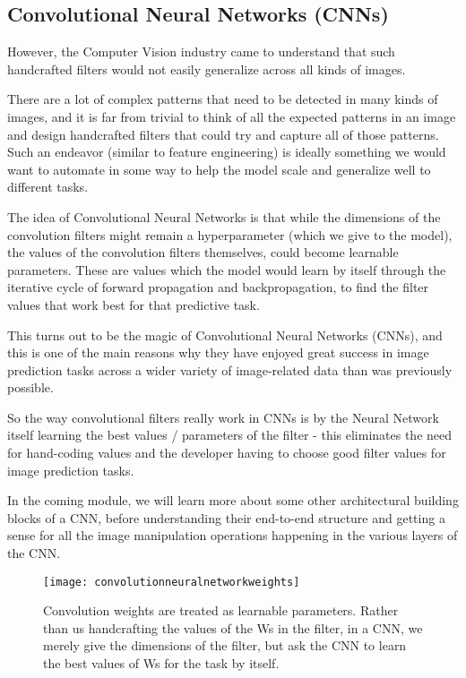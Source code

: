 	\subsection{Convolutional Neural Networks (CNNs)}
	\begin{bulletedlist}
		\item However, the Computer Vision industry came to understand that such handcrafted filters would not easily generalize across all kinds of images.
		\item There are a lot of complex patterns that need to be detected in many kinds of images, and it is far from trivial to think of all the expected patterns in an image and design handcrafted filters that could try and capture all of those patterns. Such an endeavor (similar to feature engineering) is ideally something we would want to automate in some way to help the model scale and generalize well to different tasks.
		\item The idea of Convolutional Neural Networks is that while the dimensions of the convolution filters might remain a hyperparameter (which we give to the model), the values of the convolution filters themselves, could become learnable parameters. These are values which the model would learn by itself through the iterative cycle of forward propagation and backpropagation, to find the filter values that work best for that predictive task.
		\item This turns out to be the magic of Convolutional Neural Networks (CNNs), and this is one of the main reasons why they have enjoyed great success in image prediction tasks across a wider variety of image-related data than was previously possible.
		\item So the way convolutional filters really work in CNNs is by the Neural Network itself learning the best values / parameters of the filter - this eliminates the need for hand-coding values and the developer having to choose good filter values for image prediction tasks.
		\item In the coming module, we will learn more about some other architectural building blocks of a CNN, before understanding their end-to-end structure and getting a sense for all the image manipulation operations happening in the various layers of the CNN.
	\end{bulletedlist}

	\begin{figure}[h]
		\centering
		\texttt{[image: convolutionneuralnetworkweights]}
		\caption[Convolution weights are treated as learnable parameters]{Convolution weights are treated as learnable parameters.  Rather than us handcrafting the values of the Ws in the filter, in a CNN, we merely give the dimensions of the filter, but ask the CNN to learn the best values of Ws for the task by itself.}
		\label{fig:convolutionneuralnetworkweights}
	\end{figure}


